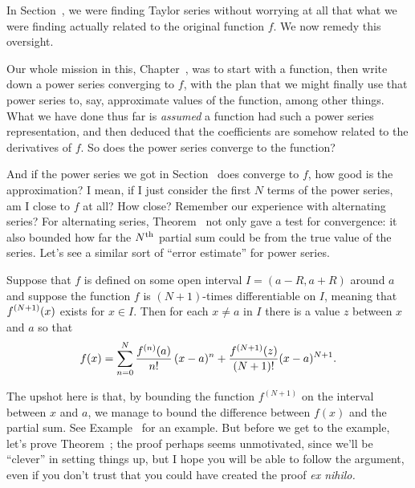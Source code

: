 \label{section:remainders}

\nobreak In Section~, we were finding
Taylor series without worrying at all that what we were finding
actually related to the original function $f$.  We now remedy this
oversight.

Our whole mission in this, Chapter~, was
to start with a function, then write down a power series converging to
$f$, with the plan that we might finally use that power series to,
say, approximate values of the function, among other things.  What we
have done thus far is \textit{assumed} a function had such a power
series representation, and then deduced that the coefficients are
somehow related to the derivatives of $f$.  So does the power series
converge to the function?

And if the power series we got in
Section~ does converge to $f$,
how good is the approximation?  I mean, if I just consider the first
$N$ terms of the power series, am I close to $f$ at all?  How close?
Remember our experience with alternating series?  For alternating
series, Theorem~ not only
gave a test for convergence: it also bounded how far the $N^{\mbox{\scriptsize th}}$
partial sum could be from the true value of the series.  Let's see a
similar sort of ``error estimate'' for power series.

\begin{theorem}\label{thm:taylors-remainder}
  Suppose that $f$ is defined on some open interval $I = (a-R,a+R)$
  around $a$ and suppose the function $f$ is $(N+1)$-times
  differentiable on $I$, meaning that $\displaystyle f^{(N+1)}(x)$ exists for $x
  \in I$. Then for each $x \neq a$ in $I$ there is a value $z$ between
  $x$ and $a$ so that
$$ 
  f(x) = \sum_{n=0}^N {f^{(n)}(a)\over n!}\,(x-a)^n + 
  {f^{(N+1)}(z)\over (N+1)!}(x-a)^{N+1}. 
$$ 
\end{theorem}
The upshot here is that, by bounding the function $f^{(N+1)}$ on the
interval between $x$ and $a$, we manage to bound the difference
between $f(x)$ and the partial sum.  See
Example~ for an example.  But before we
get to the example, let's prove Theorem~;
the proof perhaps seems unmotivated, since we'll be ``clever'' in
setting things up, but I hope you will be able to follow the argument,
even if you don't trust that you could have created the proof
\textit{ex nihilo.}

